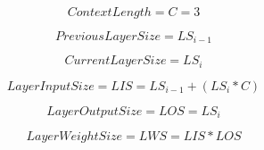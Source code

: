 \documentclass{article}
\begin{document}
\[
  Context Length=C=3
\]

\[
  Previous Layer Size=LS_{i-1}
\]

\[
  Current Layer Size=LS_{i}
\]

\[
  Layer Input Size=LIS=LS_{i-1}+(LS_{i}*C)
\]

\[
  Layer Output Size=LOS=LS_{i}
\]

\[
  Layer Weight Size=LWS=LIS*LOS
\]
\end{document}
